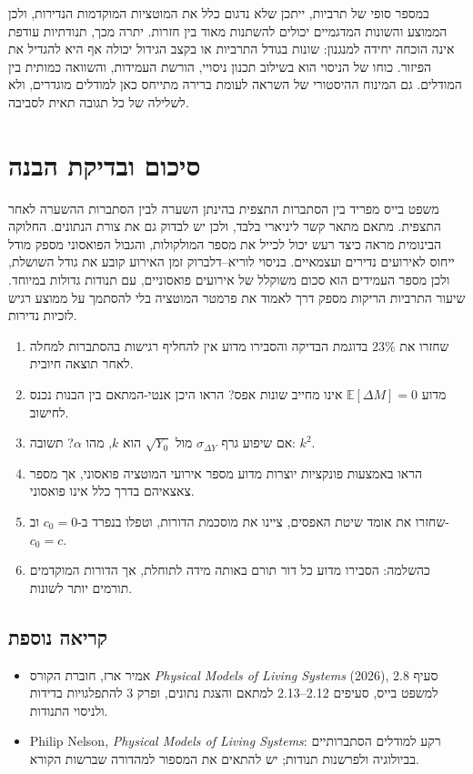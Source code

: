 במספר סופי של תרביות, ייתכן שלא נדגום כלל את המוטציות המוקדמות הנדירות, ולכן הממוצע והשונות המדגמיים יכולים להשתנות מאוד בין חזרות. יתרה מכך, תנודתיות עודפת אינה הוכחה יחידה למנגנון: שונות בגודל התרביות או בקצב הגידול יכולה אף היא להגדיל את הפיזור. כוחו של הניסוי הוא בשילוב תכנון ניסויי, הורשת העמידות, והשוואה כמותית בין המודלים. גם המינוח ההיסטורי של השראה לעומת ברירה מתייחס כאן למודלים מוגדרים, ולא לשלילה של כל תגובה תאית לסביבה.

\section{סיכום ובדיקת הבנה}\label{sec:he03-recap}
משפט בייס מפריד בין הסתברות התצפית בהינתן השערה לבין הסתברות ההשערה לאחר התצפית. מתאם מתאר קשר ליניארי בלבד, ולכן יש לבדוק גם את צורת הנתונים. החלוקה הבינומית מראה כיצד רעש יכול לכייל את מספר המולקולות, והגבול הפואסוני מספק מודל ייחוס לאירועים נדירים ועצמאיים. בניסוי לוריא--דלברוק זמן האירוע קובע את גודל השושלת, ולכן מספר העמידים הוא סכום משוקלל של אירועים פואסוניים, עם תנודות גדולות במיוחד. שיעור התרביות הריקות מספק דרך לאמוד את פרמטר המוטציה בלי להסתמך על ממוצע רגיש לזכיות נדירות.

\begin{enumerate}
\item שחזרו את $23\%$ בדוגמת הבדיקה והסבירו מדוע אין להחליף רגישות בהסתברות למחלה לאחר תוצאה חיובית.
\item מדוע $\mathbb{E}[\Delta M]=0$ אינו מחייב שונות אפס? הראו היכן אנטי-המתאם בין הבנות נכנס לחישוב.
\item אם שיפוע גרף $\sigma_{\Delta Y}$ מול $\sqrt{Y_0}$ הוא $k$, מהו $\alpha$? תשובה: $k^2$.
\item הראו באמצעות פונקציות יוצרות מדוע מספר אירועי המוטציה פואסוני, אך מספר צאצאיהם בדרך כלל אינו פואסוני.
\item שחזרו את אומד שיטת האפסים, ציינו את מוסכמת הדורות, וטפלו בנפרד ב-$c_0=0$ וב-$c_0=c$.
\item כהשלמה: הסבירו מדוע כל דור תורם באותה מידה לתוחלת, אך הדורות המוקדמים תורמים יותר לשונות.
\end{enumerate}

\subsection*{קריאה נוספת}
\begin{itemize}
\item אמיר ארז, חוברת הקורס \textenglish{\emph{Physical Models of Living Systems} (2026)}, סעיף 2.8 למשפט בייס, סעיפים 2.12--2.13 למתאם והצגת נתונים, ופרק 3 להתפלגויות בדידות ולניסוי התנודות.
\item \textenglish{Philip Nelson, \emph{Physical Models of Living Systems}}: רקע למודלים הסתברותיים בביולוגיה ולפרשנות תנודות; יש להתאים את המספור למהדורה שברשות הקורא.
\end{itemize}
